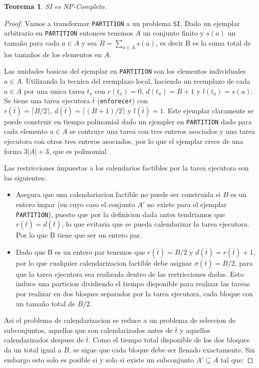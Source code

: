 \documentclass{article}
\newtheorem{theorem}{Teorema}
\begin{document}
\begin{theorem}
  SI es NP-Completo.
\end{theorem}
\begin{proof}
  Vamos a transformar \texttt{PARTITION} a un problema \texttt{SI}. Dado un ejemplar arbitrario en \texttt{PARTITION} entonces tenemos $A$ un conjunto finito y $s(a)$ un tamaño para cada $a \in A$ y sea $B = \sum_{a \in A}  s(a)$, es decir B es la suma total de los tamaños de los elementos en $A$.

  Las unidades basicas del ejemplar en \texttt{PARTITION} son los elementos individuales $a \in A$. Utilizando la tecnica del reemplazo local, haciendo un reemplazo de cada $a \in A$ por una unica tarea $t_a$ con $r(t_a) = 0,\ d(t_a) = B + 1$ y $l(t_a) = s(a)$. Se tiene una tarea ejecutora $\bar{t}$ (\texttt{enforecer}) con $r(\bar{t}) = \lceil B / 2 \rceil,\ d(\bar{t}) = \lceil (B+1) / 2 \rceil$ y $l(\bar{t}) = 1$. Este ejemplar claramente se puede construir en tiempo polinomial dado un ejempler en \texttt{PARTITION} dado para cada elemento $a \in A$ se contruye una tarea con tres enteros asociados y una tarea ejecutora con otros tres enteros asociados, por lo que el ejemplar crece de una forma $3 |A| + 3$, que es polinomial.

  Las restricciones impuestas a los calendarios factibles por la tarea ejecutora
  son las siguientes:
  \begin{itemize}
  \item Asegura que una calendariacion factible no puede ser construida si $B$ es un entero impar (en cuyo caso el conjunto $A'$ no exiete para el ejemplar \texttt{PARTITION}), puesto que por la definicion dada antes tendriamos que $r(\bar{t}) =d(\bar{t})$, lo que evitaria que se pueda calendarizar la tarea ejecutora. Por lo que B tiene que ser un entero par.
  \item Dado que B es un entero par tenemos que $r(\bar{t}) = B / 2$ y $d(\bar{t}) = r(\bar{t}) + 1$, por lo que cualquier calendarizacion factible debe asignar $\sigma(\bar{t}) = B / 2$, para que la tarea ejecutora sea realizada dentro de las restricciones dadas. Esto induce una particion dividiendo el tiempo disponible para realizar las tareas por realizar en dos bloques separados por la tarea ejecutora, cada bloque con un tamaño total de $B / 2$.
  \end{itemize}

  Asi el problema de calendarizacion se reduce a un problema de seleccion de subconjuntos, aquellos que son calendarizados antes de $\bar{t}$ y aquellos calendarizados despues de $\bar{t}$. Como el tiempo total disponible de los dos bloques da un total igual a $B$, se sigue que cada bloque debe ser llenado exactamente. Sin embargo esto solo es posible si y solo si existe un subconjunto $A' \subseteq A$ tal que:


\end{proof}
\end{document}
